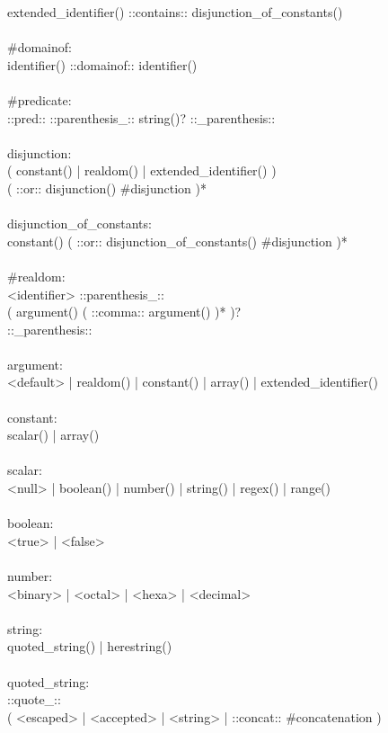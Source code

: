 \begin{bigbigpre}
    extended_identifier() ::contains:: disjunction_of_constants() \\
 \\
#domainof: \\
    identifier() ::domainof:: identifier() \\
 \\
#predicate: \\
    ::pred:: ::parenthesis_:: string()? ::_parenthesis:: \\
 \\
disjunction: \\
    ( constant() | realdom() | extended_identifier() ) \\
    ( ::or:: disjunction() #disjunction )* \\
 \\
disjunction_of_constants: \\
    constant() ( ::or:: disjunction_of_constants() #disjunction )* \\
 \\
#realdom: \\
    <identifier> ::parenthesis_:: \\
    ( argument() ( ::comma:: argument() )* )? \\
    ::_parenthesis:: \\
 \\
argument: \\
    <default> | realdom() | constant() | array() | extended_identifier() \\
 \\
constant: \\
    scalar() | array() \\
 \\
scalar: \\
    <null> | boolean() | number() | string() | regex() | range() \\
 \\
boolean: \\
    <true> | <false> \\
 \\
number: \\
    <binary> | <octal> | <hexa> | <decimal> \\
 \\
string: \\
    quoted_string() | herestring() \\
 \\
quoted_string: \\
    ::quote_:: \\
    ( <escaped> | <accepted> | <string> | ::concat:: #concatenation ) \\

\end{bigbigpre}
